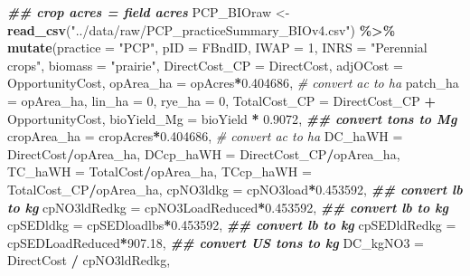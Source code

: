 \documentclass[
]{article}
\newenvironment{Shaded}{\begin{snugshade}}{\end{snugshade}}
\newcommand{\AttributeTok}[1]{\textcolor[rgb]{0.13,0.29,0.53}{#1}}
\newcommand{\CommentTok}[1]{\textcolor[rgb]{0.56,0.35,0.01}{\textit{#1}}}
\newcommand{\DecValTok}[1]{\textcolor[rgb]{0.00,0.00,0.81}{#1}}
\newcommand{\DocumentationTok}[1]{\textcolor[rgb]{0.56,0.35,0.01}{\textbf{\textit{#1}}}}
\newcommand{\FloatTok}[1]{\textcolor[rgb]{0.00,0.00,0.81}{#1}}
\newcommand{\FunctionTok}[1]{\textcolor[rgb]{0.13,0.29,0.53}{\textbf{#1}}}
\newcommand{\NormalTok}[1]{#1}
\newcommand{\OtherTok}[1]{\textcolor[rgb]{0.56,0.35,0.01}{#1}}
\newcommand{\SpecialCharTok}[1]{\textcolor[rgb]{0.81,0.36,0.00}{\textbf{#1}}}
\newcommand{\StringTok}[1]{\textcolor[rgb]{0.31,0.60,0.02}{#1}}
\begin{document}
\begin{Shaded}
\begin{Highlighting}[]
\DocumentationTok{\#\# crop acres = field acres}
\NormalTok{PCP\_BIOraw }\OtherTok{\textless{}{-}} \FunctionTok{read\_csv}\NormalTok{(}\StringTok{"../data/raw/PCP\_practiceSummary\_BIOv4.csv"}\NormalTok{) }\SpecialCharTok{\%\textgreater{}\%}
  \FunctionTok{mutate}\NormalTok{(}\AttributeTok{practice =} \StringTok{"PCP"}\NormalTok{,}
         \AttributeTok{pID =}\NormalTok{ FBndID,}
         \AttributeTok{IWAP =} \DecValTok{1}\NormalTok{,}
         \AttributeTok{INRS =} \StringTok{"Perennial crops"}\NormalTok{,}
         \AttributeTok{biomass =} \StringTok{"prairie"}\NormalTok{,}
         \AttributeTok{DirectCost\_CP =}\NormalTok{ DirectCost,}
         \AttributeTok{adjOCost =}\NormalTok{ OpportunityCost,}
         \AttributeTok{opArea\_ha =}\NormalTok{ opAcres}\SpecialCharTok{*}\FloatTok{0.404686}\NormalTok{, }\CommentTok{\# convert ac to ha}
         \AttributeTok{patch\_ha =}\NormalTok{ opArea\_ha,}
         \AttributeTok{lin\_ha =} \DecValTok{0}\NormalTok{,}
         \AttributeTok{rye\_ha =} \DecValTok{0}\NormalTok{,}
         \AttributeTok{TotalCost\_CP =}\NormalTok{ DirectCost\_CP }\SpecialCharTok{+}\NormalTok{ OpportunityCost,}
         \AttributeTok{bioYield\_Mg =}\NormalTok{ bioYield }\SpecialCharTok{*} \FloatTok{0.9072}\NormalTok{, }\DocumentationTok{\#\# convert tons to Mg}
         \AttributeTok{cropArea\_ha =}\NormalTok{ cropAcres}\SpecialCharTok{*}\FloatTok{0.404686}\NormalTok{, }\CommentTok{\# convert ac to ha}
         \AttributeTok{DC\_haWH =}\NormalTok{ DirectCost}\SpecialCharTok{/}\NormalTok{opArea\_ha,}
         \AttributeTok{DCcp\_haWH =}\NormalTok{ DirectCost\_CP}\SpecialCharTok{/}\NormalTok{opArea\_ha,}
         \AttributeTok{TC\_haWH =}\NormalTok{ TotalCost}\SpecialCharTok{/}\NormalTok{opArea\_ha,}
         \AttributeTok{TCcp\_haWH =}\NormalTok{ TotalCost\_CP}\SpecialCharTok{/}\NormalTok{opArea\_ha,}
         \AttributeTok{cpNO3ldkg =}\NormalTok{ cpNO3load}\SpecialCharTok{*}\FloatTok{0.453592}\NormalTok{, }\DocumentationTok{\#\# convert lb to kg}
         \AttributeTok{cpNO3ldRedkg =}\NormalTok{ cpNO3LoadReduced}\SpecialCharTok{*}\FloatTok{0.453592}\NormalTok{, }\DocumentationTok{\#\# convert lb to kg}
         \AttributeTok{cpSEDldkg =}\NormalTok{ cpSEDloadlbs}\SpecialCharTok{*}\FloatTok{0.453592}\NormalTok{, }\DocumentationTok{\#\# convert lb to kg}
         \AttributeTok{cpSEDldRedkg =}\NormalTok{ cpSEDLoadReduced}\SpecialCharTok{*}\FloatTok{907.18}\NormalTok{, }\DocumentationTok{\#\# convert US tons to kg}
         \AttributeTok{DC\_kgNO3 =}\NormalTok{ DirectCost }\SpecialCharTok{/}\NormalTok{ cpNO3ldRedkg,}

\end{Highlighting}
\end{Shaded}
\end{document}
